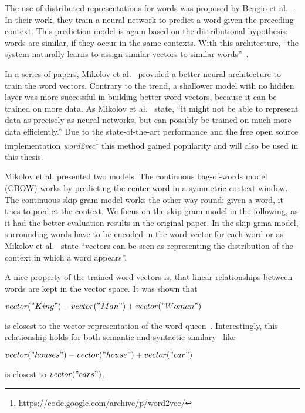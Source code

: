 \documentclass{sig-alternate-05-2015}
\begin{document}
The use of distributed representations for words was proposed by Bengio et al.~\cite{Bengio2003}.
In their work, they train a neural network to predict a word given the preceding context.
This prediction model is again based on the distributional hypothesis: words are similar, if they occur in the same contexts.
With this architecture, ``the system naturally learns to assign similar vectors to similar words''~\cite{Baroni2014}.

In a series of papers, Mikolov et al.~\cite{Mikolov2013,Mikolov2013a,Mikolov2013b} provided a better neural architecture to train the word vectors.
Contrary to the trend, a shallower model with no hidden layer was more successful in building better word vectors, because it can be trained on more data.
As Mikolov et al.~\cite{Mikolov2013a} state, ``it might not be able to represent data as precisely as neural networks, but can possibly be trained on much more data efficiently.''
Due to the state-of-the-art performance and the free open source implementation \emph{word2vec}\footnote{\url{https://code.google.com/archive/p/word2vec/}} this method gained popularity and will also be used in this thesis.

Mikolov et al. presented two models. 
The continuous bag-of-words model (CBOW) works by predicting the center word in a symmetric context window.
The continuous skip-gram model works the other way round: given a word, it tries to predict the context.
We focus on the skip-gram model in the following, as it had the better evaluation results in the original paper.
In the skip-grma model, surrounding words have to be encoded in the word vector for each word or as Mikolov et al.~\cite{Mikolov2013} state ``vectors can be seen as representing the distribution of the context in which a word appears''.


A nice property of the trained word vectors is, that linear relationships between words are kept in the vector space.
It was shown that
\begin{center}
       $vector("King") - vector("Man") + vector("Woman")$
\end{center}
is closest to the vector representation of the word queen~\cite{Mikolov2013b}.
Interestingly, this relationship holds for both semantic and syntactic similary~\cite{Mikolov2013a} like
\begin{center}
       $vector("houses") - vector("house") + vector("car")$
\end{center}
is closest to $vector("cars")$.
\end{document}
